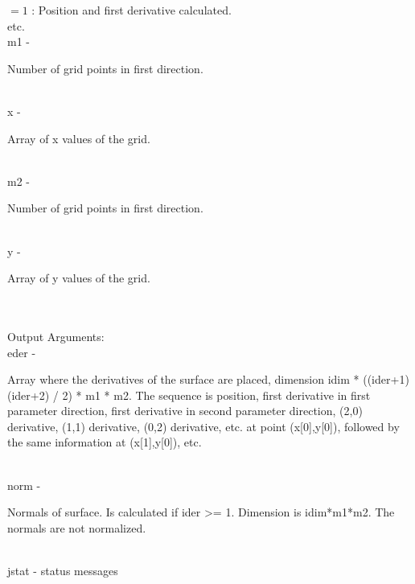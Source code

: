 		 \>\>\>\>\>      $= 1$ : Position and first derivative calculated.\\
		 \>\>\>\>\>      etc.\\	 
        \>\>    {\fov m1}\> - \>  \begin{minipg2}
                     Number of grid points in first direction.
                               \end{minipg2}\\
        \>\>    {\fov x}\> - \>  \begin{minipg2}
                     Array of x values of the grid.
                               \end{minipg2}\\
        \>\>    {\fov m2}\> - \>  \begin{minipg2}
                     Number of grid points in first direction.
                               \end{minipg2}\\
        \>\>    {\fov y}\> - \>  \begin{minipg2}
                     Array of y values of the grid.
                               \end{minipg2}\\
\\
	\>Output Arguments:\\
        \>\>    {\fov eder}\> - \>  \begin{minipg2}
                     Array where the derivatives of the surface
                       are placed, dimension
                         idim * ((ider+1)(ider+2) / 2) * m1 * m2.
                       The sequence is position,
                       first derivative in first parameter direction,
                       first derivative in second parameter direction,
                       (2,0) derivative, (1,1) derivative, (0,2)
                       derivative, etc. at point (x[0],y[0]),
                       followed by the same information at (x[1],y[0]),
                       etc.
                               \end{minipg2}\\
        \>\>    {\fov norm}\> - \>  \begin{minipg2}
                     Normals of surface. Is calculated if ider >= 1.
                       Dimension is idim*m1*m2.
                       The normals are not normalized.
                               \end{minipg2}\\
        \>\>    {\fov jstat}\> - \> status messages \\

